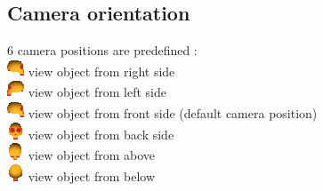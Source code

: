 \subsection{Camera orientation}
6 camera positions are predefined :\\
\includegraphics{images/pixmap/right2.png} view object from right side \\
\includegraphics{images/pixmap/left2.png} view object from left side\\
\includegraphics{images/pixmap/right2.png} view object from front side (default camera position)\\
\includegraphics{images/pixmap/front2.png} view object from back side\\
\includegraphics{images/pixmap/above2.png} view object from above\\
\includegraphics{images/pixmap/back2.png} view object from below\\

